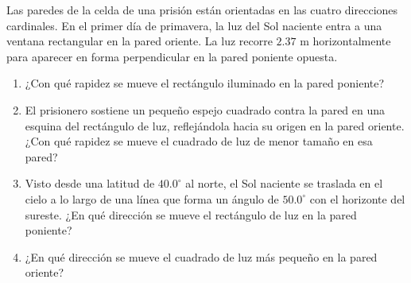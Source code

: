 \item Las paredes de la celda de una prisión están orientadas en las cuatro direcciones cardinales. En el primer día de primavera, la luz del Sol naciente entra a una ventana rectangular en la pared oriente. La luz recorre $2.37\text{ m}$ horizontalmente para aparecer en forma perpendicular en la pared poniente opuesta.
\begin{enumerate}
    \item ¿Con qué rapidez se mueve el rectángulo iluminado en la pared poniente?
    \item El prisionero sostiene un pequeño espejo cuadrado contra la pared en una esquina del rectángulo de luz, reflejándola hacia su origen en la pared oriente. ¿Con qué rapidez se mueve el cuadrado de luz de menor tamaño en esa pared?
    \item Visto desde una latitud de $40.0^\circ$ al norte, el Sol naciente se traslada en el cielo a lo largo de una línea que forma un ángulo de $50.0^\circ$ con el horizonte del sureste. ¿En qué dirección se mueve el rectángulo de luz en la pared poniente?
    \item ¿En qué dirección se mueve el cuadrado de luz más pequeño en la pared oriente?
\end{enumerate}